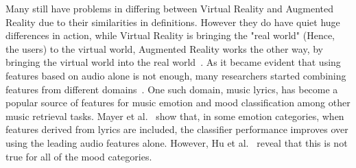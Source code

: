 \documentclass{llncs}
\begin{document}
Many still have problems in differing between Virtual Reality and Augmented Reality due to their similarities in definitions. However they do have quiet huge differences in action, while Virtual Reality is bringing the "real world" (Hence, the users) to the virtual world, Augmented Reality works the other way, by bringing the virtual world into the real world~\cite{DBLP:journals/taslp/LuLZ06}. As it became evident that using features based on audio alone is not enough, many researchers started combining features from different domains~\cite{DBLP:conf/ismir/KimSMMRSST10}.
One such domain, music lyrics, has become a popular source of features for music emotion and mood classification among other music retrieval tasks. Mayer et al.~\cite{DBLP:conf/mm/MayerNR08} show that, in some emotion categories, when features derived from lyrics are included, the classifier performance improves over using the leading audio features alone. However, Hu et al.~\cite{DBLP:conf/ismir/HuDE09} reveal that this is not true for all of the mood categories. 
\end{document}
